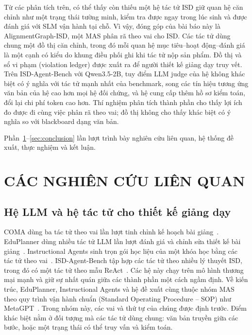 \documentclass[conference,a4paper]{IEEEtran}
\begin{document}
Từ các phân tích trên, có thể thấy còn thiếu một hệ tác tử ISD giữ quan hệ căn
chỉnh như một trạng thái tường minh, kiểm tra được ngay trong lúc sinh và được
đánh giá với SLM vận hành tại chỗ. Vì vậy, đóng góp của bài báo này là
AlignmentGraph-ISD, một MAS phân rã theo vai cho ISD. Các tác tử dùng chung
một đồ thị căn chỉnh, trong đó mỗi quan hệ mục tiêu--hoạt động--đánh giá là một
cạnh có kiểu do khung điều phối ghi khi tác tử nộp sản phẩm. Đồ thị và sổ
vi phạm (violation ledger) được xuất ra để người thiết kế giảng dạy truy vết. Trên
ISD-Agent-Bench với Qwen3.5-2B, tuy điểm LLM judge của hệ không khác biệt có ý nghĩa với tác tử
mạnh nhất của benchmark, song các tín hiệu tương ứng văn bản của hệ cao hơn mọi hệ
đối chứng, và hệ cung cấp thêm hồ sơ kiểm toán, đổi lại chi phí token cao hơn. Thí nghiệm phân tích thành phần cho thấy lợi ích đo được đi cùng
việc phân rã theo vai; đồ thị không cho thấy khác biệt có ý nghĩa so với blackboard dạng văn bản.

Phần~\ref{sec:related}--\ref{sec:conclusion} lần lượt trình bày nghiên cứu liên quan,
hệ thống đề xuất, thực nghiệm và kết luận.

\section{CÁC NGHIÊN CỨU LIÊN QUAN}
\label{sec:related}

\subsection{Hệ LLM và hệ tác tử cho thiết kế giảng dạy}
COMA dùng ba tác tử theo vai lần lượt tinh chỉnh kế hoạch bài giảng~\cite{zeng2026coma}. EduPlanner dùng nhiều tác tử LLM lần lượt đánh
giá và chỉnh sửa thiết kế bài giảng~\cite{zhang2025eduplanner}. Instructional
Agents sinh trọn gói học liệu của một khóa học bằng các tác tử theo
vai~\cite{yao2025instructionalagents}.
ISD-Agent-Bench tập hợp các tác tử theo nhiều lý thuyết ISD, trong đó có một tác
tử theo mẫu ReAct~\cite{isdagentbench,yao2023react}. Các hệ này chạy trên mô
hình thương mại mạnh và giữ sự nhất quán giữa các thành phần một cách ngầm định.
Về kiến trúc, EduPlanner, Instructional Agents và hệ đề xuất cùng thuộc nhóm MAS theo quy trình vận hành
chuẩn (Standard Operating Procedure -- SOP) như MetaGPT~\cite{hong2024metagpt,guo2024mas}.
Trong nhóm này, các vai và thứ tự của chúng được định trước. Điểm khác biệt nằm ở
đối tượng mà các tác tử dùng chung: văn bản truyền giữa các bước, hoặc một trạng
thái có thể truy vấn và kiểm toán.
\end{document}
